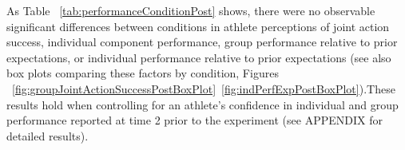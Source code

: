 \documentclass[english]{article}\usepackage[]{graphicx}\usepackage[]{color}
\begin{document}
As Table ~\ref{tab:performanceConditionPost} shows, there were no observable significant differences between conditions in athlete perceptions of joint action success, individual component performance, group performance relative to prior expectations, or individual performance relative to prior expectations (see also box plots comparing these factors by condition, Figures ~\ref{fig:groupJointActionSuccessPostBoxPlot}\nobreakdash~\ref{fig:indPerfExpPostBoxPlot}).These results hold when controlling for an athlete's confidence in individual and group performance reported at time 2 prior to the experiment (see APPENDIX for detailed results).
\end{document}
